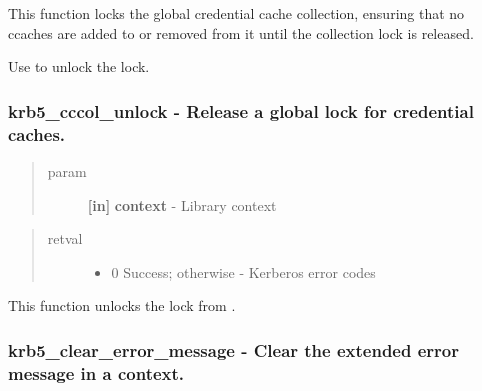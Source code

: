 \documentclass[letterpaper,10pt,english]{sphinxmanual}
\begin{document}
This function locks the global credential cache collection, ensuring that no ccaches are added to or removed from it until the collection lock is released.

Use {\hyperref[appdev/refs/api/krb5_cccol_unlock:c.krb5_cccol_unlock]{}} to unlock the lock.


\subsubsection{krb5\_cccol\_unlock -  Release a global lock for credential caches.}
\label{appdev/refs/api/krb5_cccol_unlock:krb5-cccol-unlock-release-a-global-lock-for-credential-caches}\label{appdev/refs/api/krb5_cccol_unlock::doc}

\begin{fulllineitems}
\label{appdev/refs/api/krb5_cccol_unlock:c.krb5_cccol_unlock}
\end{fulllineitems}

\begin{quote}\begin{description}
\item[{param}] \leavevmode
\textbf{{[}in{]}} \textbf{context} - Library context

\end{description}\end{quote}
\begin{quote}\begin{description}
\item[{retval}] \leavevmode\begin{itemize}
\item {} 
0   Success; otherwise - Kerberos error codes

\end{itemize}

\end{description}\end{quote}

This function unlocks the lock from {\hyperref[appdev/refs/api/krb5_cccol_lock:c.krb5_cccol_lock]{}} .


\subsubsection{krb5\_clear\_error\_message -  Clear the extended error message in a context.}
\label{appdev/refs/api/krb5_clear_error_message:krb5-clear-error-message-clear-the-extended-error-message-in-a-context}\label{appdev/refs/api/krb5_clear_error_message::doc}
\end{document}
